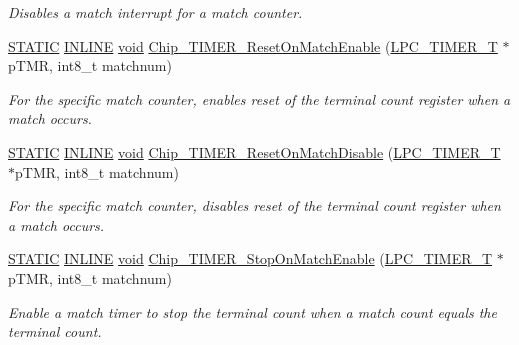 \begin{DoxyCompactItemize}
\begin{DoxyCompactList}\small\item\em Disables a match interrupt for a match counter. \end{DoxyCompactList}\item 
\hyperlink{group__LPC__Types__Public__Macros_ga10b2d890d871e1489bb02b7e70d9bdfb}{S\-T\-A\-T\-I\-C} \hyperlink{group__LPC__Types__Public__Types_ga2eb6f9e0395b47b8d5e3eeae4fe0c116}{I\-N\-L\-I\-N\-E} \hyperlink{Paradigm_2Tern__EE_2small_2portmacro_8h_a14d32f8130d3c0b212cfc751730b5b49}{void} \hyperlink{group__TIMER__17XX__40XX_ga4b8a551b290e9f70ba8b8569e2937f58}{Chip\-\_\-\-T\-I\-M\-E\-R\-\_\-\-Reset\-On\-Match\-Enable} (\hyperlink{structLPC__TIMER__T}{L\-P\-C\-\_\-\-T\-I\-M\-E\-R\-\_\-\-T} $\ast$p\-T\-M\-R, int8\-\_\-t matchnum)
\begin{DoxyCompactList}\small\item\em For the specific match counter, enables reset of the terminal count register when a match occurs. \end{DoxyCompactList}\item 
\hyperlink{group__LPC__Types__Public__Macros_ga10b2d890d871e1489bb02b7e70d9bdfb}{S\-T\-A\-T\-I\-C} \hyperlink{group__LPC__Types__Public__Types_ga2eb6f9e0395b47b8d5e3eeae4fe0c116}{I\-N\-L\-I\-N\-E} \hyperlink{Paradigm_2Tern__EE_2small_2portmacro_8h_a14d32f8130d3c0b212cfc751730b5b49}{void} \hyperlink{group__TIMER__17XX__40XX_gae203cf1a04cbbf63e966de3a5bd9c29e}{Chip\-\_\-\-T\-I\-M\-E\-R\-\_\-\-Reset\-On\-Match\-Disable} (\hyperlink{structLPC__TIMER__T}{L\-P\-C\-\_\-\-T\-I\-M\-E\-R\-\_\-\-T} $\ast$p\-T\-M\-R, int8\-\_\-t matchnum)
\begin{DoxyCompactList}\small\item\em For the specific match counter, disables reset of the terminal count register when a match occurs. \end{DoxyCompactList}\item 
\hyperlink{group__LPC__Types__Public__Macros_ga10b2d890d871e1489bb02b7e70d9bdfb}{S\-T\-A\-T\-I\-C} \hyperlink{group__LPC__Types__Public__Types_ga2eb6f9e0395b47b8d5e3eeae4fe0c116}{I\-N\-L\-I\-N\-E} \hyperlink{Paradigm_2Tern__EE_2small_2portmacro_8h_a14d32f8130d3c0b212cfc751730b5b49}{void} \hyperlink{group__TIMER__17XX__40XX_gaf76a0a1282598f976f04c00595b6332c}{Chip\-\_\-\-T\-I\-M\-E\-R\-\_\-\-Stop\-On\-Match\-Enable} (\hyperlink{structLPC__TIMER__T}{L\-P\-C\-\_\-\-T\-I\-M\-E\-R\-\_\-\-T} $\ast$p\-T\-M\-R, int8\-\_\-t matchnum)
\begin{DoxyCompactList}\small\item\em Enable a match timer to stop the terminal count when a match count equals the terminal count. \end{DoxyCompactList}\item 

\end{DoxyCompactItemize}
